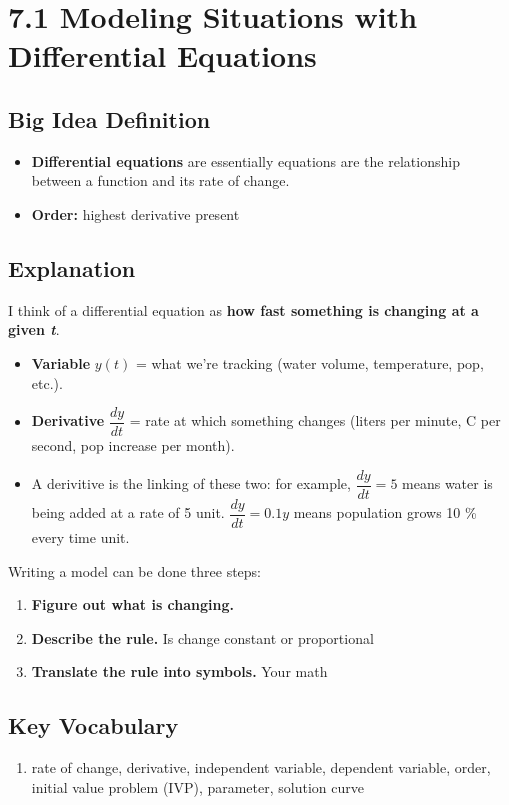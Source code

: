 \documentclass{article}
\begin{document}
\section{7.1 Modeling Situations with Differential Equations}
\subsection*{Big Idea Definition}
\begin{itemize}
  \item \textbf{Differential equations} are essentially equations are the relationship between a function and its rate of change.
  \item \textbf{Order:} highest derivative present 
\end{itemize}

\subsection*{Explanation}
I think of a differential equation as \textbf{how fast something is changing at a given \textit{t}}.

\begin{itemize}
  \item \textbf{Variable} $y(t)$ = what we’re tracking (water volume, temperature, pop, etc.).
  \item \textbf{Derivative} $\dfrac{dy}{dt}$ = rate at which something changes (liters per minute, C per second, pop increase per month).
  \item A derivitive is the linking of these two: for example, $\dfrac{dy}{dt}=5$ means water is being added at a rate of 5 {unit}.
        $\dfrac{dy}{dt}=0.1y$ means population grows 10 \% every time unit.
\end{itemize}

Writing a model can be done three steps:

\begin{enumerate}
  \item \textbf{Figure out what is changing.} 
  \item \textbf{Describe the rule.} Is change constant or proportional
  \item \textbf{Translate the rule into symbols.} Your math 
\end{enumerate}

\medskip

\subsection*{Key Vocabulary}
\begin{enumerate}
    \item rate of change, derivative, independent variable, dependent variable, order, initial value problem (IVP), parameter, solution curve
\end{enumerate}
\end{document}

